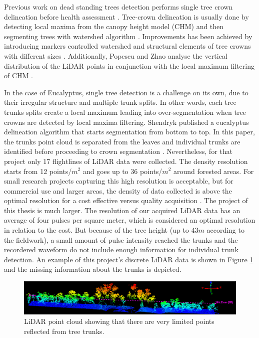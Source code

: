 \documentclass{subfiles}
\begin{document}
\par Previous work on dead standing trees detection performs single tree crown delineation before health assessment \cite{Yao2012} \cite{Shendryk2016_DeadTrees}. Tree-crown delineation is usually done by detecting local maxima from the canopy height model (CHM) and then segmenting trees with watershed algorithm \cite{Popescu2003}. Improvements has been achieved by introducing markers controlled watershed \cite{Jing2012} and structural elements of tree crowns with different sizes \cite{Hu2014}. Additionally, Popescu and Zhao analyse the vertical distribution of the LiDAR points in conjunction with the local maximum filtering of CHM \cite{Popescu2008}.


\par  In the case of Eucalyptus, single tree detection is a challenge on its own, due to their irregular structure and multiple trunk splits. In other words, each tree trunks splits create a local maximum leading into over-segmentation when tree crowns are detected by local maxima filtering. Shendryk published a eucalyptus delineation algorithm that starts segmentation from bottom to top. In this paper, the trunks point cloud is separated from the leaves and individual trunks are identified before proceeding to crown segmentation \cite{Shendryk2016_treeDeliniation}. Nevertheless, for that project only 17 flightlines of LiDAR data were collected. The density resolution starts from 12 points/$m^2$ and goes up to 36 points/$m^2$ around forested areas. For small research projects capturing this high resolution is acceptable, but for commercial use and larger areas, the density of data collected is above the optimal resolution for a cost effective versus quality acquisition \cite{Lovell2005}. The project of this thesis is much larger. The resolution of our acquired LiDAR data has an average of four pulses per square meter, which is considered an optimal resolution in relation to the cost. But because of the tree height (up to $43m$ according to the fieldwork), a small amount of pulse intensity reached the trunks and the recordered waveform do not include enough information for individual trunk detection.  An example of this project's discrete LiDAR data is shown in Figure \ref{fig:NoTrunks} and the missing information about the trunks is depicted.

\begin{figure} [h!]
	\centering
	\includegraphics[trim={7cm 0 1.7cm 0},clip,width=\textwidth]{img/dead/TreesNoTrunks}
	\caption{LiDAR point cloud showing that there are very limited points reflected from tree trunks.}
	\label{fig:NoTrunks}
\end{figure}
\end{document}
